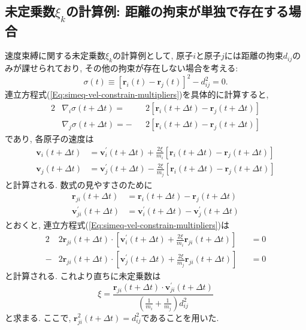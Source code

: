 \subsection{未定乗数$\xi_{k}$の計算例: 距離の拘束が単独で存在する場合}

速度束縛に関する未定乗数$\xi_{k}$の計算例として, 原子$i$と原子$j$には距離の拘束$d_{ij}$のみが課せられており, その他の拘束が存在しない場合を考える:
\begin{equation}
    \sigma(t)  \equiv [\bm{r}_{i}(t) - \bm{r}_{j}(t)]^{2} - d_{ij}^2 = 0.
\end{equation}
連立方程式(\ref{Eq:simeq-vel-constrain-multipliers})を具体的に計算すると, 
\begin{alignat}{2}
    &\nabla_{i} \sigma(t + \Delta t)
    =
    &&2\left[\bm{r}_{i}(t + \Delta t) - \bm{r}_{j} (t + \Delta t)\right]
    \\
    &\nabla_{j} \sigma(t + \Delta t)
    =
    -&&2\left[\bm{r}_{i}(t + \Delta t) - \bm{r}_{j} (t + \Delta t)\right]
\end{alignat}
であり, 各原子の速度は
\begin{align}
    \bm{v}_{i} (t + \Delta t)
    &=
    \bm{v}_{i}^{\prime} (t + \Delta t)
    +
    \frac{2\xi}{m_{i}}
    \left[\bm{r}_{i}(t + \Delta t) - \bm{r}_{j} (t + \Delta t)\right]
    \\
    \bm{v}_{j} (t + \Delta t)
    &=
    \bm{v}_{j}^{\prime} (t + \Delta t)
    -
    \frac{2\xi}{m_{j}}
    \left[\bm{r}_{i}(t + \Delta t) - \bm{r}_{j} (t + \Delta t)\right]
\end{align}
と計算される. 数式の見やすさのために
\begin{align}
    \bm{r}_{ji} (t + \Delta t)
    &=
    \bm{r}_{i}(t + \Delta t) - \bm{r}_{j} (t + \Delta t)
    \\
    \bm{v}_{ji}^{\prime} (t + \Delta t)
    &=
    \bm{v}_{i}^{\prime} (t + \Delta t) - \bm{v}_{j}^{\prime} (t + \Delta t)
\end{align}
とおくと, 連立方程式(\ref{Eq:simeq-vel-constrain-multipliers})は
\begin{alignat}{2}
    &2\bm{r}_{ji} (t + \Delta t) \cdot
    \left[
        \bm{v}_{i}^{\prime} (t + \Delta t)
        +
        \frac{2\xi}{m_{i}} \bm{r}_{ji} (t + \Delta t)
    \right]
    &&=0
    \\
    -&2\bm{r}_{ji} (t + \Delta t) \cdot
    \left[
        \bm{v}_{j}^{\prime} (t + \Delta t)
        +
        \frac{2\xi}{m_{j}} \bm{r}_{ji} (t + \Delta t)
    \right]
    &&=0
\end{alignat}
と計算される. これより直ちに未定乗数は
\begin{equation}
    \xi
    =
    \frac{\bm{r}_{ji} (t + \Delta t) \cdot \bm{v}_{ji}^{\prime} (t + \Delta t)}
    {\left( \frac{1}{m_{i}} + \frac{1}{m_{j}}\right) d_{ij}^{2}}
\end{equation}
と求まる. 
ここで, $\bm{r}_{ji}^{2} (t + \Delta t) = d_{ij}^{2}$であることを用いた. 




